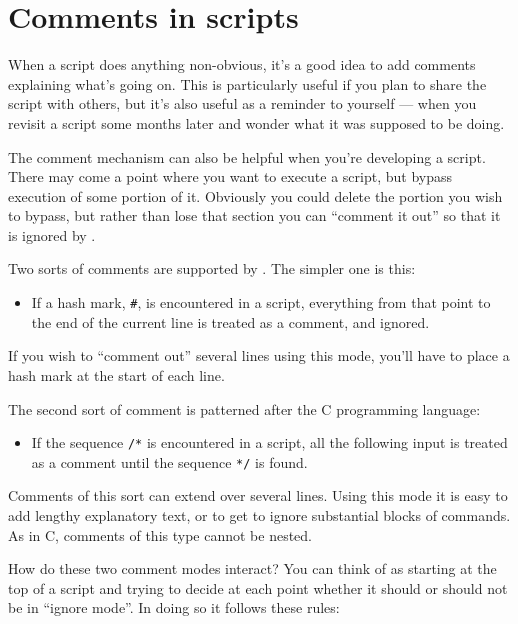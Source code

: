 \chapter{Comments in scripts}
\label{chap:comments}

When a script does anything non-obvious, it's a good idea to add
comments explaining what's going on.  This is particularly useful if
you plan to share the script with others, but it's also useful as a
reminder to yourself --- when you revisit a script some months later
and wonder what it was supposed to be doing.

The comment mechanism can also be helpful when you're developing a
script.  There may come a point where you want to execute a script,
but bypass execution of some portion of it.  Obviously you could
delete the portion you wish to bypass, but rather than lose that
section you can ``comment it out'' so that it is ignored by
.

Two sorts of comments are supported by .  The simpler one
is this:

\begin{itemize}
\item If a hash mark, \texttt{\#}, is encountered in a  script, 
  everything from that point to the end of the current line is treated as a 
  comment, and ignored.
\end{itemize}

If you wish to ``comment out'' several lines using this mode, you'll
have to place a hash mark at the start of each line.

The second sort of comment is patterned after the C programming language:

\begin{itemize}
\item If the sequence \texttt{/*} is encountered in a script, all the
  following input is treated as a comment until the sequence \texttt{*/}
  is found.
\end{itemize}

Comments of this sort can extend over several lines.  Using this mode
it is easy to add lengthy explanatory text, or to get  to
ignore substantial blocks of commands.  As in C, comments of this
type cannot be nested.

How do these two comment modes interact?  You can think of
 as starting at the top of a script and trying to decide at
each point whether it should or should not be in ``ignore mode''.  In
doing so it follows these rules:

